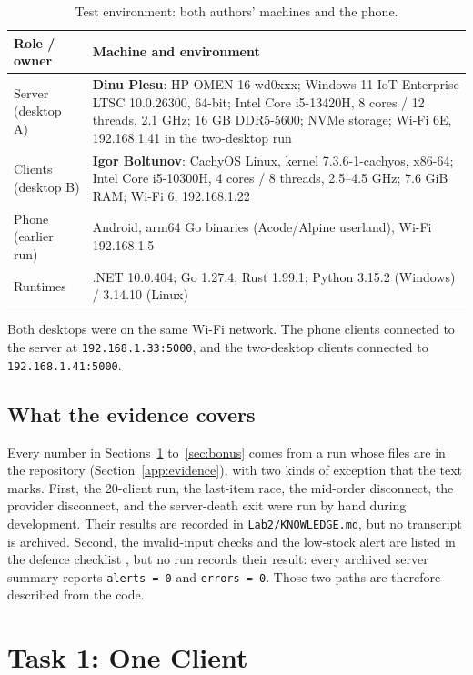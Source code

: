 \documentclass[12pt,a4paper]{article}
\begin{document}
\begin{table}[H]
\centering
\small
\begin{tabularx}{\textwidth}{@{}l X@{}}
\toprule
Role / owner & Machine and environment \\
\midrule
Server (desktop A) & \textbf{Dinu Plesu}: HP OMEN 16-wd0xxx; Windows 11 IoT Enterprise LTSC 10.0.26300, 64-bit; Intel Core i5-13420H, 8 cores / 12 threads, 2.1 GHz; 16 GB DDR5-5600; NVMe storage; Wi-Fi 6E, 192.168.1.41 in the two-desktop run \\
Clients (desktop B) & \textbf{Igor Boltunov}: CachyOS Linux, kernel 7.3.6-1-cachyos, x86-64; Intel Core i5-10300H, 4 cores / 8 threads, 2.5--4.5 GHz; 7.6 GiB RAM; Wi-Fi 6, 192.168.1.22 \\
Phone (earlier run) & Android, arm64 Go binaries (Acode/Alpine userland), Wi-Fi 192.168.1.5 \\
Runtimes &.NET 10.0.404; Go 1.27.4; Rust 1.99.1; Python 3.15.2 (Windows) / 3.14.10 (Linux) \\
\bottomrule
\end{tabularx}
\caption{Test environment: both authors' machines and the phone.}
\label{tab:env}
\end{table}

Both desktops were on the same Wi-Fi network. The phone clients connected to the
server at \texttt{192.168.1.33:5000}, and the two-desktop clients connected to
\texttt{192.168.1.41:5000}.

\subsection{What the evidence covers}

Every number in Sections~\ref{sec:task1} to~\ref{sec:bonus} comes from a run whose
files are in the repository (Section~\ref{app:evidence}), with two kinds of exception
that the text marks. First, the 20-client run, the last-item race, the mid-order
disconnect, the provider disconnect, and the server-death exit were run by hand during
development. Their results are recorded in \texttt{Lab2/KNOWLEDGE.md}, but no transcript
is archived. Second, the invalid-input checks and the low-stock alert are listed in the
defence checklist , but no run records their result:
every archived server summary reports \texttt{alerts = 0} and \texttt{errors = 0}. Those
two paths are therefore described from the code.

\section{Task 1: One Client}
\label{sec:task1}
\end{document}
